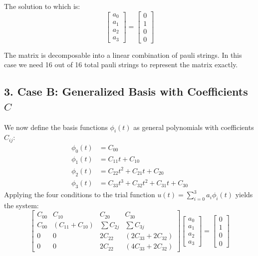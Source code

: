 \documentclass{article}
\begin{document}
The solution to which is:
\begin{equation}
\begin{bmatrix} 
a_0 \\ a_1 \\ a_2 \\ a_3
\end{bmatrix} = 
\begin{bmatrix} 
0 \\ 1 \\ 0 \\ 0
\end{bmatrix}
\end{equation}

The matrix is decomposable into a linear combination of pauli strings.
In this case we need 16 out of 16 total pauli strings to represent the matrix exactly.


\subsection*{3. Case B: Generalized Basis with Coefficients $C$}
We now define the basis functions $\phi_i(t)$ as general polynomials with coefficients $C_{ij}$:
\begin{align*}
    \phi_0(t) &= C_{00} \\
    \phi_1(t) &= C_{11}t + C_{10} \\
    \phi_2(t) &= C_{22}t^2 + C_{21}t + C_{20} \\
    \phi_3(t) &= C_{33}t^3 + C_{32}t^2 + C_{31}t + C_{30}
\end{align*}
Applying the four conditions to the trial function $u(t) = \sum_{i=0}^3 a_i \phi_i(t)$ yields the system:
\begin{equation}
\begin{bmatrix} 
C_{00} & C_{10} & C_{20} & C_{30} \\ 
C_{00} & (C_{11} + C_{10}) & \sum C_{2j} & \sum C_{3j} \\ 
0 & 0 & 2C_{22} & (2C_{33} + 2C_{32}) \\ 
0 & 0 & 2C_{22} & (4C_{33} + 2C_{32}) 
\end{bmatrix}
\begin{bmatrix} 
a_0 \\ 
a_1 \\ 
a_2 \\ 
a_3 
\end{bmatrix} 
= 
\begin{bmatrix} 
0 \\ 
1 \\ 
0 \\ 
0 
\end{bmatrix}
\end{equation}
\end{document}
